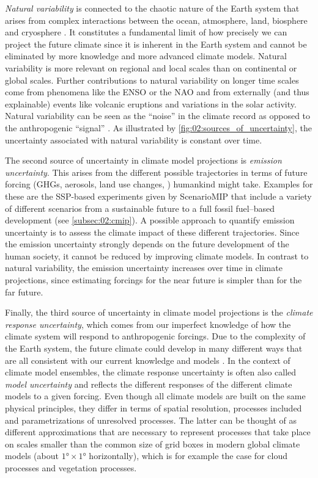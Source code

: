 \emph{Natural variability} is connected to the chaotic nature of the Earth
system that arises from complex interactions between the ocean, atmosphere,
land, biosphere and cryosphere \autocite{Cubasch2013}. It constitutes a
fundamental limit of how precisely we can project the future climate since it
is inherent in the Earth system and cannot be eliminated by more knowledge and
more advanced climate models. Natural variability is more relevant on regional
and local scales than on continental or global scales. Further contributions to
natural variability on longer time scales come from phenomena like the
\ac{ENSO} or the \ac{NAO} and from externally (and thus explainable) events
like volcanic eruptions and variations in the solar activity. Natural
variability can be seen as the \enquote{noise} in the climate record as opposed
to the anthropogenic \enquote{signal} \autocite{Cubasch2013}. As illustrated by
\cref{fig:02:sources_of_uncertainty}, the uncertainty associated with natural
variability is constant over time.

The second source of uncertainty in climate model projections is \emph{emission
  uncertainty}. This arises from the different possible trajectories in terms
of future forcing (\acp{GHG}, aerosols, land use changes, \etc{}) humankind
might take. Examples for these are the \ac{SSP}-based experiments given by
\ac{ScenarioMIP} that include a variety of different scenarios from a
sustainable future to a full fossil fuel--based development (see
\cref{subsec:02:cmip}). A possible approach to quantify emission uncertainty is
to assess the climate impact of these different trajectories. Since the
emission uncertainty strongly depends on the future development of the human
society, it cannot be reduced by improving climate models. In contrast to
natural variability, the emission uncertainty increases over time in climate
projections, since estimating forcings for the near future is simpler than for
the far future.

Finally, the third source of uncertainty in climate model projections is the
\emph{climate response uncertainty}, which comes from our imperfect knowledge
of how the climate system will respond to anthropogenic forcings. Due to the
complexity of the Earth system, the future climate could develop in many
different ways that are all consistent with our current knowledge and models
\autocite{Cubasch2013}. In the context of climate model ensembles, the climate
response uncertainty is often also called \emph{model uncertainty} and reflects
the different responses of the different climate models to a given forcing.
Even though all climate models are built on the same physical principles, they
differ in terms of spatial resolution, processes included and parametrizations
of unresolved processes. The latter can be thought of as different
approximations that are necessary to represent processes that take place on
scales smaller than the common size of grid boxes in modern global climate
models (about $\ang{1} \times \ang{1}$ horizontally), which is for example the
case for cloud processes and vegetation processes.

